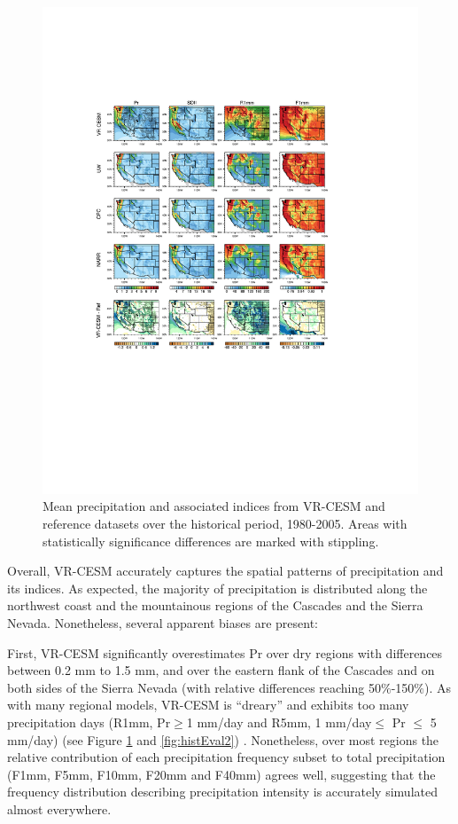 \begin{figure}
\begin{center}
\includegraphics[width=6in, trim={3cm 6.5cm 5.2cm 4.9cm},clip]{wd_index_Hist_ref_annual_part1.pdf}
\caption{Mean precipitation and associated indices from VR-CESM and reference datasets over the historical period, 1980-2005.  Areas with statistically significance differences are marked with stippling.}
\label{fig:histEval1}
\end{center}
\end{figure}

Overall, VR-CESM accurately captures the spatial patterns of precipitation and its indices.  As expected, the majority of precipitation is distributed along the northwest coast and the mountainous regions of the Cascades and the Sierra Nevada.  Nonetheless, several apparent biases are present:


First, VR-CESM significantly overestimates Pr over dry regions with differences between 0.2 mm to 1.5 mm, and over the eastern flank of the Cascades and on both sides of the Sierra Nevada (with relative differences reaching 50$\%$-150$\%$).  As with many regional models, VR-CESM is ``dreary'' and exhibits too many precipitation days (R1mm, Pr$\geq$1 mm/day and R5mm, 1 mm/day$\leq$ Pr $\leq$ 5 mm/day) (see Figure \ref{fig:histEval1} and \ref{fig:histEval2}) \cite{stephens2010dreary}.  Nonetheless, over most regions the relative contribution of each precipitation frequency subset to total precipitation (F1mm, F5mm, F10mm, F20mm and F40mm) agrees well, suggesting that the frequency distribution describing precipitation intensity is accurately simulated almost everywhere.

